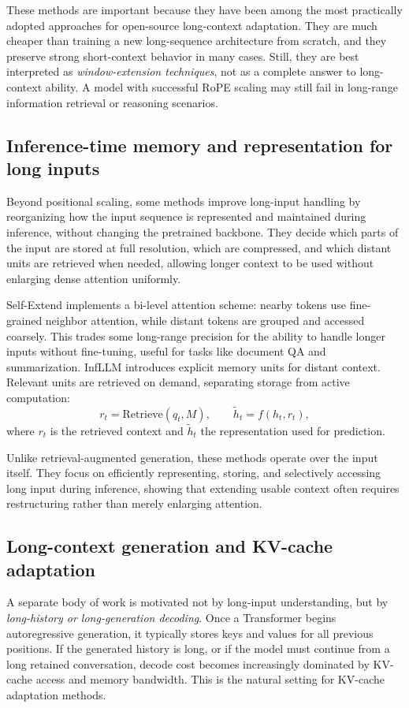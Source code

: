 \documentclass[11pt]{article}
\begin{document}
These methods are important because they have been among the most practically adopted approaches for open-source long-context adaptation. They are much cheaper than training a new long-sequence architecture from scratch, and they preserve strong short-context behavior in many cases. Still, they are best interpreted as \emph{window-extension techniques}, not as a complete answer to long-context ability. A model with successful RoPE scaling may still fail in long-range information retrieval or reasoning scenarios.


\subsection{Inference-time memory and representation for long inputs}

Beyond positional scaling, some methods improve long-input handling by reorganizing how the input sequence is represented and maintained during inference, without changing the pretrained backbone. They decide which parts of the input are stored at full resolution, which are compressed, and which distant units are retrieved when needed, allowing longer context to be used without enlarging dense attention uniformly.

Self-Extend \citep{jin2024selfextend} implements a bi-level attention scheme: nearby tokens use fine-grained neighbor attention, while distant tokens are grouped and accessed coarsely. This trades some long-range precision for the ability to handle longer inputs without fine-tuning, useful for tasks like document QA and summarization. InfLLM \citep{xiao2024infllm} introduces explicit memory units for distant context. Relevant units are retrieved on demand, separating storage from active computation:
\begin{equation}
r_t = \mathrm{Retrieve}(q_t, M), \qquad
\tilde{h}_t = f(h_t, r_t),
\end{equation}
where $r_t$ is the retrieved context and $\tilde{h}_t$ the representation used for prediction.

Unlike retrieval-augmented generation, these methods operate over the input itself. They focus on efficiently representing, storing, and selectively accessing long input during inference, showing that extending usable context often requires restructuring rather than merely enlarging attention.

\subsection{Long-context generation and KV-cache adaptation}
A separate body of work is motivated not by long-input understanding, but by \emph{long-history or long-generation decoding}. Once a Transformer begins autoregressive generation, it typically stores keys and values for all previous positions. If the generated history is long, or if the model must continue from a long retained conversation, decode cost becomes increasingly dominated by KV-cache access and memory bandwidth. This is the natural setting for KV-cache adaptation methods.
\end{document}
